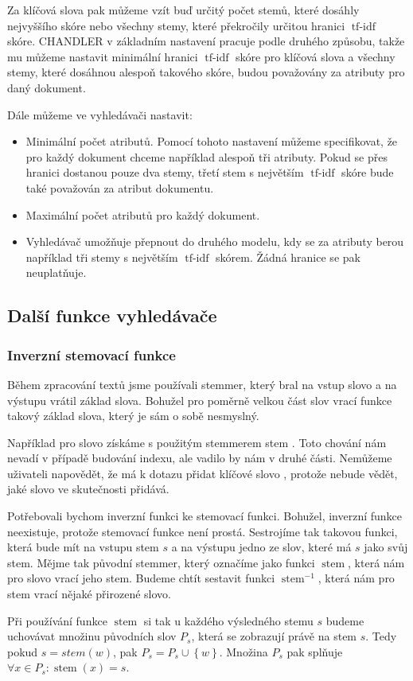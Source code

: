\documentclass[12pt]{article}
\newcommand{\name}{CHANDLER}
\newcommand{\ssection}[1]{\subsection{#1}}
\newcommand{\sssection}[1]{\subsubsection{#1}}
\newcommand{\adds}[1]{\left\{#1\right\}}
\DeclareMathOperator{\tfidf}{tf-idf}
\DeclareMathOperator{\stem}{stem}
\newcommand{\invstem}{\stem^{-1}}
\begin{document}
Za klíčová slova pak můžeme vzít buď určitý počet stemů, které dosáhly nejvyššího skóre nebo všechny stemy, které překročily určitou hranici $\tfidf$ skóre. \name{} v základním nastavení pracuje podle druhého způsobu, takže mu můžeme nastavit minimální hranici $\tfidf$ skóre pro klíčová slova a všechny stemy, které dosáhnou alespoň takového skóre, budou považovány za atributy pro daný dokument. 

Dále můžeme ve vyhledávači nastavit:

\begin{itemize}
	\item Minimální počet atributů. Pomocí tohoto nastavení můžeme specifikovat, že pro každý dokument chceme například alespoň tři atributy. Pokud se přes hranici dostanou pouze dva stemy, třetí stem s největším $\tfidf$ skóre bude také považován za atribut dokumentu. 
	\item Maximální počet atributů pro každý dokument. 
	\item Vyhledávač umožňuje přepnout do druhého modelu, kdy se za atributy berou například tři stemy s největším $\tfidf$ skórem. Žádná hranice se pak neuplatňuje. 
\end{itemize}

\ssection{Další funkce vyhledávače}
\sssection{Inverzní stemovací funkce}

Během zpracování textů jsme používali stemmer, který bral na vstup slovo a na výstupu vrátil základ slova. Bohužel pro poměrně velkou část slov vrací funkce takový základ slova, který je sám o sobě nesmyslný. 

Například pro slovo  získáme s použitým stemmerem stem . Toto chování nám nevadí v případě budování indexu, ale vadilo by nám v druhé části. Nemůžeme uživateli napovědět, že má k dotazu přidat klíčové slovo , protože nebude vědět, jaké slovo ve skutečnosti přidává. 

Potřebovali bychom inverzní funkci ke stemovací funkci. Bohužel, inverzní funkce neexistuje, protože stemovací funkce není prostá. Sestrojíme tak takovou funkci, která bude mít na vstupu stem $s$ a na výstupu jedno ze slov, které má $s$ jako svůj stem. Mějme tak původní stemmer, který označíme jako funkci $\stem$, která nám pro slovo vrací jeho stem. Budeme chtít sestavit funkci $\invstem$, která nám pro stem vrací nějaké přirozené slovo.

Při používání funkce $\stem$ si tak u každého výsledného stemu $s$ budeme uchovávat množinu původních slov $P_s$, která se zobrazují právě na stem $s$. Tedy pokud $s=stem(w)$, pak $P_s=P_s\cup\adds{w}$. Množina $P_s$ pak splňuje $\forall x\in P_s: \stem(x)=s$. 
\end{document}
